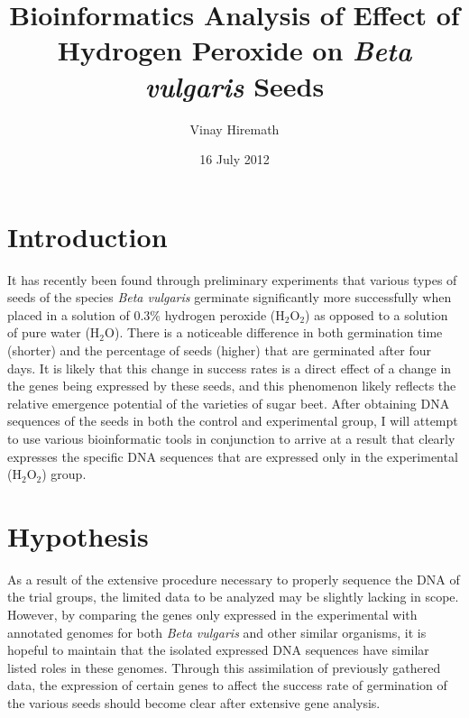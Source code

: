 \documentclass{article}
\begin{document}
\title{Bioinformatics Analysis of Effect of Hydrogen Peroxide on \emph{Beta vulgaris} Seeds}
\author{Vinay Hiremath}
\date{16 July 2012}
\maketitle
\section{Introduction}
	It has recently been found through preliminary experiments that various types of seeds of the species \emph{Beta vulgaris} germinate significantly more successfully when placed in a solution of 0.3\% hydrogen peroxide (H$_{2}$O$_{2}$) as opposed to a solution of pure water (H$_{2}$O). There is a noticeable difference in both germination time (shorter) and the percentage of seeds (higher) that are germinated after four days. It is likely that this change in success rates is a direct effect of a change in the genes being expressed by these seeds, and this phenomenon likely reflects the relative emergence potential of the varieties of sugar beet. After obtaining DNA sequences of the seeds in both the control and experimental group, I will attempt to use various bioinformatic tools in conjunction to arrive at a result that clearly expresses the specific DNA sequences that are expressed only in the experimental (H$_{2}$O$_{2}$) group.
\section{Hypothesis}
	As a result of the extensive procedure necessary to properly sequence the DNA of the trial groups, the limited data to be analyzed may be slightly lacking in scope. However, by comparing the genes only expressed in the experimental with annotated genomes for both \emph{Beta vulgaris} and other similar organisms, it is hopeful to maintain that the isolated expressed DNA sequences have similar listed roles in these genomes. Through this assimilation of previously gathered data, the expression of certain genes to affect the success rate of germination of the various seeds should become clear after extensive gene analysis.
\end{document}
